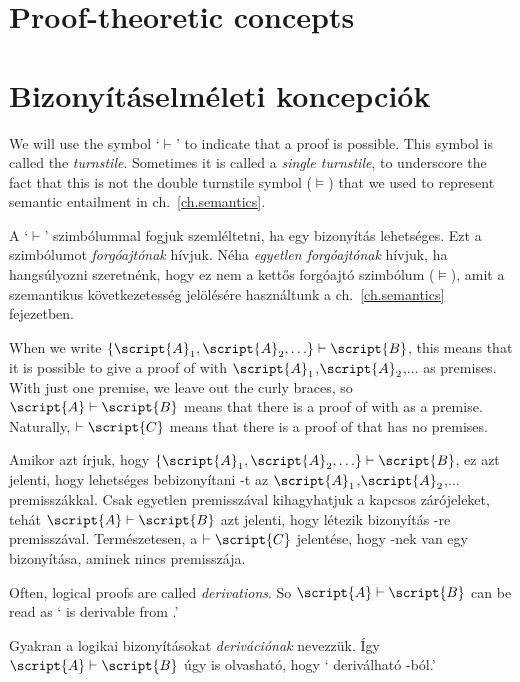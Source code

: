 

\section{Proof-theoretic concepts}

\section{Bizonyításelméleti koncepciók}

We will use the symbol `$\vdash$' to indicate that a proof is possible. This symbol is called the \emph{turnstile}. Sometimes it is called a \emph{single turnstile}, to underscore the fact that this is not the {double turnstile} symbol ($\models$) that we used to represent semantic entailment in ch.~\ref{ch.semantics}.

A `$\vdash$' szimbólummal fogjuk szemléltetni, ha egy bizonyítás lehetséges. Ezt a szimbólumot \emph{forgóajtónak} hívjuk. Néha \emph{egyetlen forgóajtónak} hívjuk, ha hangsúlyozni szeretnénk, hogy ez nem a {kettős forgóajtó} szimbólum ($\models$), amit a szemantikus következetesség jelölésére használtunk a ch.~\ref{ch.semantics} fejezetben.

When we write $\{\script{A}_1,\script{A}_2,\ldots\}\vdash\script{B}$, this means that it is possible to give a proof of  with $\script{A}_1$,$\script{A}_2$,$\ldots$ as premises. With just one premise, we leave out the curly braces, so $\script{A}\vdash\script{B}$ means that there is a proof of  with  as a premise. Naturally, $\vdash\script{C}$ means that there is a proof of  that has no premises.

Amikor azt írjuk, hogy $\{\script{A}_1,\script{A}_2,\ldots\}\vdash\script{B}$, ez azt jelenti, hogy lehetséges bebizonyítani  -t az $\script{A}_1$,$\script{A}_2$,$\ldots$ premisszákkal. Csak egyetlen premisszával kihagyhatjuk a kapcsos zárójeleket, tehát $\script{A}\vdash\script{B}$ azt jelenti, hogy létezik bizonyítás -re  premisszával. Természetesen, a $\vdash\script{C}$ jelentése, hogy -nek van egy bizonyítása, aminek nincs premisszája.

Often, logical proofs are called \emph{derivations}. So $\script{A}\vdash\script{B}$ can be read as ` is derivable from .'

Gyakran a logikai bizonyításokat \emph{derivációnak} nevezzük. Így $\script{A}\vdash\script{B}$ úgy is olvasható, hogy ` deriválható -ból.'


